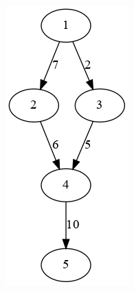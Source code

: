 \documentclass[11pt]{article}
\begin{document}
\begin{itemize}
\begin{center}
\includegraphics[width=.9\linewidth]{kruscals.png}
\end{center}
\end{itemize}
\end{document}
